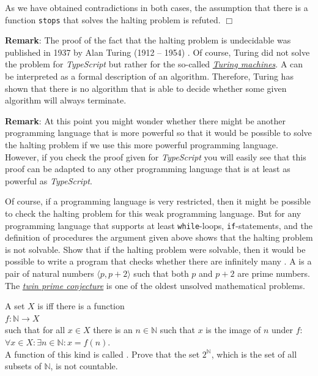 As we have obtained contradictions in both cases, the assumption that there is a function
\texttt{stops} that solves the halting problem is refuted.
\hspace*{\fill} $\Box$
\vspace*{0.3cm}

\noindent
\textbf{Remark}:
The proof of the fact that the halting problem is undecidable was published in 1937 by Alan Turing (1912 -- 1954)
\cite{turing:1937}.
Of course, Turing did not solve the problem for \textsl{TypeScript} but rather
for the so-called 
\href{https://en.wikipedia.org/wiki/Turing_machine}{\emph{Turing machines}}.
A   
can be interpreted as a formal description of an algorithm.
Therefore, Turing has shown that there is no algorithm that is able to decide whether some given
algorithm will always terminate.
\vspace*{0.3cm}

\noindent
\textbf{Remark}:
At this point you might wonder whether there might be another programming language
that is more powerful so that it would be possible to solve the halting problem if we use this more powerful
programming language.
However, if you check the proof given for \textsl{TypeScript} you will easily
see that this proof can be adapted to any other programming language that is at least as powerful as
\textsl{TypeScript}.
\eox

Of course, if a programming language is very restricted, then it might be possible to check the
halting problem for this weak programming language.
But for any programming language that supports
at least \texttt{while}-loops, \texttt{if}-statements, and the definition of procedures the argument
given above shows that the halting problem is not solvable.
\exerciseEng
Show that if the halting problem were solvable, then it would be possible to write a program that checks
whether there are infinitely many .
A  is a pair of natural numbers
$\langle p, p + 2 \rangle$ such that both $p$ and $p+2$ are prime numbers.
The \href{http://en.wikipedia.org/wiki/Twin_prime_conjecture}{\emph{twin prime conjecture}} is one
of the oldest unsolved mathematical problems.
\eox

\exerciseEng
A set $X$ is  iff there is a function 
\\[0.2cm]
\hspace*{1.3cm}
 $f: \mathbb{N} \rightarrow X$ 
\\[0.2cm]
such that for all $x\in X$ there is an $n \in \mathbb{N}$ such that $x$ is the image of
$n$ under $f$: 
\\[0.2cm]
\hspace*{1.3cm} $\forall x \in X: \exists n \in \mathbb{N}: x = f(n)$.
\\[0.2cm]
A function of this kind is called . 
Prove that the set $2^\mathbb{N}$, which is the set of all subsets of $\mathbb{N}$, is not countable.
\vspace*{0.2cm}

